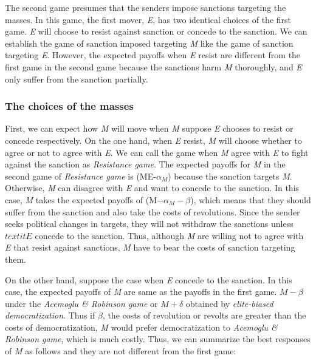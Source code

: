 \documentclass[11pt, letterpage]{article}
\begin{document}
The second game presumes that the senders impose sanctions targeting the masses. In this game, the first mover, \textit{E}, has two identical choices of the first game. \textit{E} will choose to resist against sanction or concede to the sanction. We can establish the game of sanction imposed targeting \textit{M} like the game of sanction targeting \textit{E}. However, the expected payoffs when \textit{E} resist are different from the first game in the second game because the sanctions harm \textit{M} thoroughly, and \textit{E} only suffer from the sanction partially.
		
\subsubsection*{The choices of the masses}
	
First, we can expect how \textit{M} will move when \textit{M} suppose \textit{E} chooses to resist or concede respectively. On the one hand, when \textit{E} resist, \textit{M} will choose whether to agree or not to agree with \textit{E}. We can call the game when \textit{M} agree with \textit{E} to fight against the sanction as \textit{Resistance game}. The expected payoffs for \textit{M} in the second game of \textit{Resistance game} is (ME-$\alpha_{M}$) because the sanction targets \textit{M}. Otherwise, \textit{M} can disagree with \textit{E} and want to concede to the sanction. In this case, \textit{M} takes the expected payoffs of (M$-\alpha_{M}-\beta$), which means that they should suffer from the sanction and also take the costs of revolutions. Since the sender seeks political changes in targets, they will not withdraw the sanctions unless $textit{E}$ concede to the sanction. Thus, although \textit{M} are willing not to agree with \textit{E} that resist against sanctions, \textit{M} have to bear the costs of sanction targeting them.
	
On the other hand, suppose the case when \textit{E} concede to the sanction. In this case, the expected payoffs of \textit{M} are same as the payoffs in the first game. $M-\beta$ under the \textit{Acemoglu \& Robinson game} or $M + \delta$ obtained by \textit{elite-biased democratization}. Thus if $\beta$, the costs of revolution or revolts are greater than the costs of democratization, \textit{M} would prefer democratization to \textit{Acemoglu \& Robinson game}, which is much costly. Thus, we can summarize the best responses of \textit{M} as follows and they are not different from the first game:
	
\end{document}
